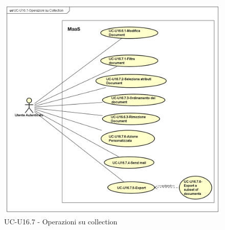     \begin{figure}[H]
      \begin{center}
        \includegraphics[width=12cm]{res/img/UCUtenti/UCUtenteA/UC-U16.7-Operazioni_su_Collection/UC-U16.7-Operazioni_su_Collection}
      \caption{UC-U16.7 - Operazioni su collection}
      \end{center} 
    \end{figure}

